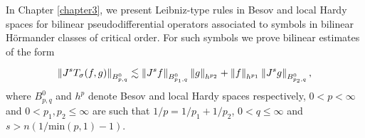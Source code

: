 In Chapter \ref{chapter3}, we present Leibniz-type rules in Besov and local Hardy spaces for bilinear pseudodifferential operators associated to symbols in bilinear H\"ormander classes of critical order. For such symbols we prove bilinear estimates of the form 

\begin{equation}
\left\|J^s T_\sigma(f,g)\right\|_{B^0_{p,q}} \lesssim \left\|J^s f\right\|_{B^0_{p_1,q}} \left\|g\right\|_{h^{p_2}} + \left\|f\right\|_{h^{p_1}}\left\|J^s g\right\|_{B^0_{p_2,q}},
\end{equation}
where $B^0_{p,q}$ and $h^p$ denote Besov and local Hardy spaces respectively, $0<p<\infty$ and $0<p_1,p_2\leq\infty$ are such that $1/p = 1/p_1 + 1/p_2$, $0<q\leq\infty$ and $s>n(1/\text{min}(p,1) - 1)$.




